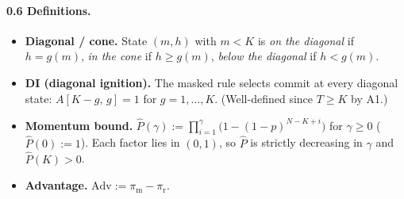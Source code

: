 \paragraph{0.6 Definitions.}
\begin{itemize}
\item \textbf{Diagonal / cone.} State $(m,h)$ with $m < K$ is \emph{on the diagonal} if $h = g(m)$, \emph{in the cone} if $h \ge g(m)$, \emph{below the diagonal} if $h < g(m)$.
\item \textbf{DI (diagonal ignition).} The masked rule selects commit at every diagonal state: $A[K-g,\, g] = 1$ for $g = 1, \dots, K$. (Well-defined since $T \ge K$ by A1.)
\item \textbf{Momentum bound.} $\widehat P(\gamma) := \prod_{i=1}^{\gamma} \bigl( 1 - (1-p)^{N-K+i} \bigr)$ for $\gamma \ge 0$ ($\widehat P(0) := 1$). Each factor lies in $(0,1)$, so $\widehat P$ is strictly decreasing in $\gamma$ and $\widehat P(K) > 0$.
\item \textbf{Advantage.} $\mathrm{Adv} := \pi_{\mathrm{m}} - \pi_{\mathrm{r}}$.
\end{itemize}

